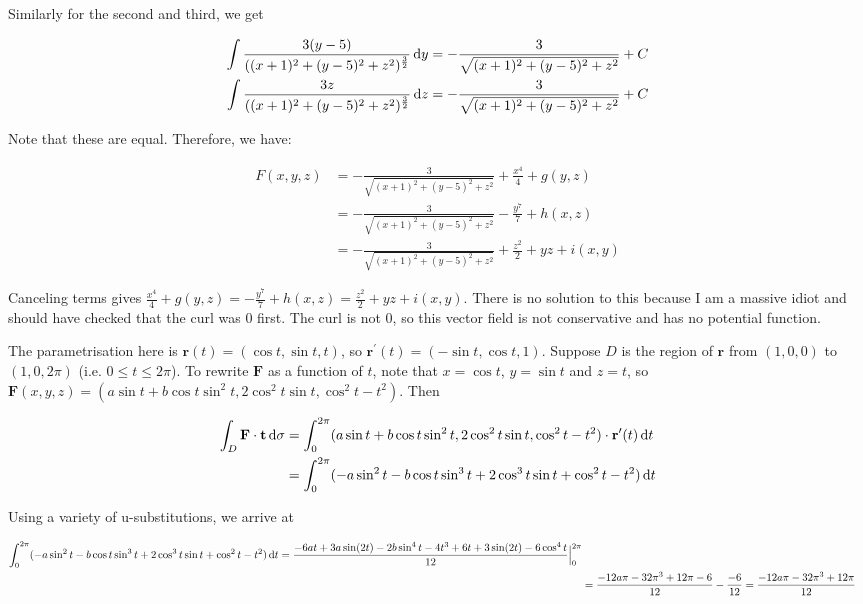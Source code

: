 Similarly for the second and third, we get

\begin{align*}
  \int \frac{3(y - 5)}{((x + 1)^2 + (y - 5)^2 + z^2)^{\frac{3}{2}}} \mathop{}\!\mathrm{d} y &= -\frac{3}{\sqrt{(x + 1)^2 + (y - 5)^2 + z^2}} + C \\
  \int \frac{3z}{((x + 1)^2 + (y - 5)^2 + z^2)^{\frac{3}{2}}} \mathop{}\!\mathrm{d} z &= -\frac{3}{\sqrt{(x + 1)^2 + (y - 5)^2 + z^2}} + C
\end{align*}

Note that these are equal. Therefore, we have:

\begin{align*}
  F(x, y, z) &= -\frac{3}{\sqrt{(x + 1)^2 + (y - 5)^2 + z^2}} + \frac{x^4}{4} + g(y, z) \\
  &= -\frac{3}{\sqrt{(x + 1)^2 + (y - 5)^2 + z^2}} - \frac{y^7}{7} + h(x, z) \\
  &= -\frac{3}{\sqrt{(x + 1)^2 + (y - 5)^2 + z^2}} + \frac{z^2}{2} + yz + i(x, y)
\end{align*}

Canceling terms gives $\frac{x^4}{4} + g(y, z) = -\frac{y^7}{7} + h(x, z) = \frac{z^2}{2} + yz + i(x, y)$. There is no solution to this because I am a massive idiot and should have checked that the curl was 0 first. The curl is not 0, so this vector field is not conservative and has no potential function.


The parametrisation here is $\mathbf{r}(t) = (\cos t, \sin t, t)$, so $\mathbf{r}^{\prime}(t) = (-\sin t, \cos t, 1)$. Suppose $D$ is the region of $\mathbf{r}$ from $(1, 0, 0)$ to $(1, 0, 2\pi)$ (i.e. $0 \leq t \leq 2\pi$). To rewrite $\mathbf{F}$ as a function of $t$, note that $x = \cos t$, $y = \sin t$ and $z = t$, so $\mathbf{F}(x, y, z) = (a \sin t + b \cos t \sin^2 t, 2 \cos^2 t \sin t, \cos^2 t - t^2)$. Then

\begin{align*}
  \int_D \mathbf{F} \cdot \mathbf{t} \mathop{}\!\mathrm{d} \sigma &= \int_0^{2\pi} (a \sin t + b \cos t \sin^2 t, 2 \cos^2 t \sin t, \cos^2 t - t^2) \cdot \mathbf{r}^{\prime}(t) \mathop{}\!\mathrm{d} t \\
  &= \int_0^{2\pi} (-a \sin^2 t - b \cos t \sin^3 t + 2 \cos^3 t \sin t + \cos^2 t - t^2) \mathop{}\!\mathrm{d} t
\end{align*}

Using a variety of u-substitutions, we arrive at

\begin{align*}
  \int_0^{2\pi} (-a \sin^2 t - b \cos t \sin^3 t + 2 \cos^3 t \sin t + \cos^2 t - t^2) \mathop{}\!\mathrm{d} t = \frac{-6at + 3a\sin(2t) - 2b\sin^4 t - 4t^3 + 6t + 3\sin(2t) - 6\cos^4 t}{12}\Big|_0^{2\pi} \\
  &= \frac{-12a\pi - 32\pi^3 + 12\pi - 6}{12} - \frac{-6}{12} = \frac{-12a\pi - 32\pi^3 + 12\pi}{12}
\end{align*}

